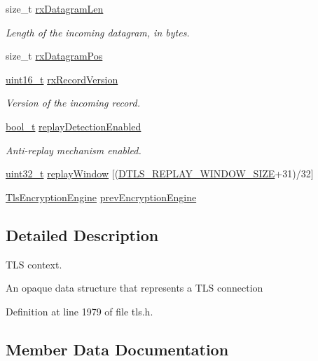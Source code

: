 \begin{DoxyCompactItemize}
size\+\_\+t \hyperlink{struct__TlsContext_a43f02da6c03900e788621df80ae9e0a3}{rx\+Datagram\+Len}
\begin{DoxyCompactList}\small\item\em Length of the incoming datagram, in bytes. \end{DoxyCompactList}\item 
size\+\_\+t \hyperlink{struct__TlsContext_a0b9ae5ea6b410db3af8440f4d57c76e7}{rx\+Datagram\+Pos}
\item 
\hyperlink{stdint_8h_a273cf69d639a59973b6019625df33e30}{uint16\+\_\+t} \hyperlink{struct__TlsContext_ad61766a5c8676e28222b3320e3e70297}{rx\+Record\+Version}
\begin{DoxyCompactList}\small\item\em Version of the incoming record. \end{DoxyCompactList}\item 
\hyperlink{compiler__port_8h_a812d16e5494522586b3784e55d479912}{bool\+\_\+t} \hyperlink{struct__TlsContext_a5bdc45f6229103da62ba653066eec850}{replay\+Detection\+Enabled}
\begin{DoxyCompactList}\small\item\em Anti-\/replay mechanism enabled. \end{DoxyCompactList}\item 
\hyperlink{stdint_8h_a435d1572bf3f880d55459d9805097f62}{uint32\+\_\+t} \hyperlink{struct__TlsContext_ae438744f6aea50a637e038c7b3553358}{replay\+Window} \mbox{[}(\hyperlink{dtls__misc_8h_afc5026200d6435351fa01e175671bbfd}{D\+T\+L\+S\+\_\+\+R\+E\+P\+L\+A\+Y\+\_\+\+W\+I\+N\+D\+O\+W\+\_\+\+S\+I\+ZE}+31)/32\mbox{]}
\item 
\hyperlink{structTlsEncryptionEngine}{Tls\+Encryption\+Engine} \hyperlink{struct__TlsContext_ac0cefbab1e25255c34e83796d8f62a09}{prev\+Encryption\+Engine}
\end{DoxyCompactItemize}


\subsection{Detailed Description}
T\+LS context. 

An opaque data structure that represents a T\+LS connection 

Definition at line 1979 of file tls.\+h.



\subsection{Member Data Documentation}
\mbox{\label{struct__TlsContext_a0de33795f577b764ae96c86400b07425}} 
